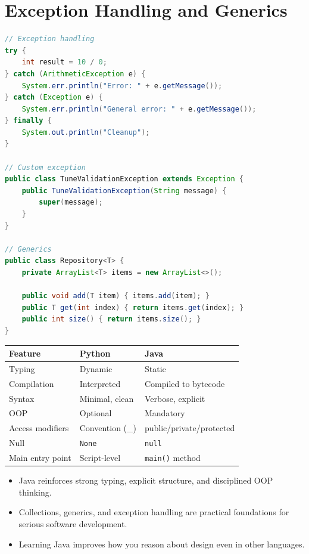 \documentclass[12pt, a4paper, oneside]{book}
\begin{document}
\section{Exception Handling and Generics}

\begin{lstlisting}[language=Java, caption={Java exceptions and generics}]
// Exception handling
try {
    int result = 10 / 0;
} catch (ArithmeticException e) {
    System.err.println("Error: " + e.getMessage());
} catch (Exception e) {
    System.err.println("General error: " + e.getMessage());
} finally {
    System.out.println("Cleanup");
}

// Custom exception
public class TuneValidationException extends Exception {
    public TuneValidationException(String message) {
        super(message);
    }
}

// Generics
public class Repository<T> {
    private ArrayList<T> items = new ArrayList<>();

    public void add(T item) { items.add(item); }
    public T get(int index) { return items.get(index); }
    public int size() { return items.size(); }
}
\end{lstlisting}

\begin{center}
\begin{tabular}{l l l}
\toprule
\textbf{Feature} & \textbf{Python} & \textbf{Java} \\
\midrule
Typing & Dynamic & Static \\
Compilation & Interpreted & Compiled to bytecode \\
Syntax & Minimal, clean & Verbose, explicit \\
OOP & Optional & Mandatory \\
Access modifiers & Convention (\_) & public/private/protected \\
Null & \texttt{None} & \texttt{null} \\
Main entry point & Script-level & \texttt{main()} method \\
\bottomrule
\end{tabular}
\end{center}

\begin{summarybox}
\begin{itemize}[leftmargin=2em]
    \item Java reinforces strong typing, explicit structure, and disciplined OOP thinking.
    \item Collections, generics, and exception handling are practical foundations for serious software development.
    \item Learning Java improves how you reason about design even in other languages.
\end{itemize}
\end{summarybox}
\end{document}
